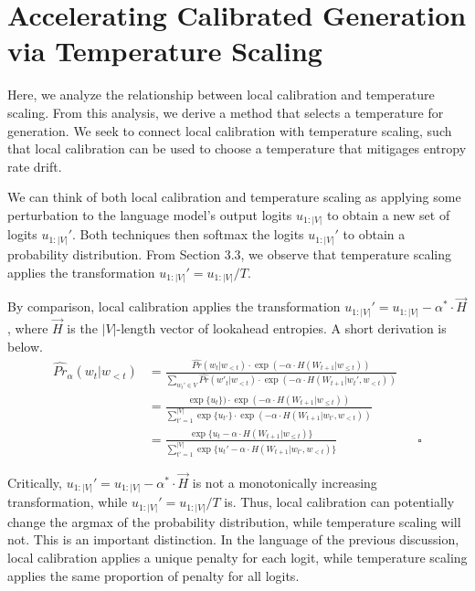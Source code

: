 \documentclass[pageno]{jpaper}
\begin{document}
\section{Accelerating Calibrated Generation via Temperature Scaling}

Here, we analyze the relationship between local calibration and temperature scaling. From this analysis, we derive a method that selects a temperature for generation. We seek to connect local calibration with temperature scaling, such that local calibration can be used to choose a temperature that mitigages entropy rate drift.

We can think of both local calibration and temperature scaling as applying some perturbation to the language model's output logits $u_{1:|V|}$ to obtain a new set of logits $u_{1:|V|}'$. Both techniques then softmax the logits $u_{1:|V|}'$ to obtain a probability distribution. From Section 3.3, we observe that temperature scaling applies the transformation $u_{1:|V|}' = u_{1:|V|} / T$.

By comparison, local calibration applies the transformation $u_{1:|V|}' = u_{1:|V|} - \alpha^* \cdot \vec{H}$, where $\vec{H}$ is the $|V|$-length vector of lookahead entropies. A short derivation is below.
\begin{align*}
    \widehat{Pr}_\alpha(w_t | w_{<t}) 
    &= \frac{\widehat{Pr} (w_t | w_{<t}) \cdot \exp \left( -\alpha \cdot H(W_{t+1} | w_{\leq t})\right)}{\sum_{w_t' \in V}\widehat{Pr} (w'_t | w_{<t}) \cdot \exp \left( -\alpha \cdot H(W_{t+1} | w_t', w_{<t})\right)} \\
    &= \frac{\exp \{u_t\}) \cdot \exp \left( -\alpha \cdot H(W_{t+1} | w_{\leq t})\right)}{\sum_{t'=1}^{|V|} \exp \{u_{t'}\} \cdot \exp \left( -\alpha \cdot H(W_{t+1} | w_{t'}, w_{<t})\right)} \\ 
    &= \frac{\exp \{u_t -\alpha \cdot H(W_{t+1} | w_{\leq t})\}}{\sum_{t'=1}^{|V|} \exp \{u_t' -\alpha \cdot H(W_{t+1} | w_{t'}, w_{<t})\}} && \square
\end{align*}

Critically, $u_{1:|V|}' = u_{1:|V|} - \alpha^* \cdot \vec{H}$ is not a monotonically increasing transformation, while $u_{1:|V|}' = u_{1:|V|} / T$ is. Thus, local calibration can potentially change the argmax of the probability distribution, while temperature scaling will not. This is an important distinction. In the language of the previous discussion, local calibration applies a unique penalty for each logit, while temperature scaling applies the same proportion of penalty for all logits. 
\end{document}
